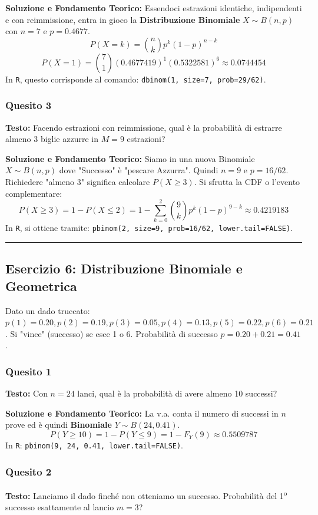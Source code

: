 \documentclass[12pt, a4paper]{article}
\begin{document}
\textbf{Soluzione e Fondamento Teorico:} 
Essendoci estrazioni identiche, indipendenti e con reimmissione, entra in gioco la \textbf{Distribuzione Binomiale} $X \sim B(n,p)$ con $n=7$ e $p=0.4677$.
$$ P(X=k) = \binom{n}{k} p^k (1-p)^{n-k} $$
$$ P(X=1) = \binom{7}{1} (0.4677419)^1 (0.5322581)^6 \approx 0.0744454 $$
In \texttt{R}, questo corrisponde al comando: \texttt{dbinom(1, size=7, prob=29/62)}.

\subsubsection*{Quesito 3}
\textbf{Testo:} Facendo estrazioni con reimmissione, qual è la probabilità di estrarre almeno 3 biglie azzurre in $M=9$ estrazioni?

\textbf{Soluzione e Fondamento Teorico:} 
Siamo in una nuova Binomiale $X \sim B(n,p)$ dove "Successo" è "pescare Azzurra". Quindi $n=9$ e $p=16/62$.
Richiedere "almeno 3" significa calcolare $P(X \ge 3)$. Si sfrutta la CDF o l'evento complementare:
$$ P(X \ge 3) = 1 - P(X \le 2) = 1 - \sum_{k=0}^{2} \binom{9}{k} p^k (1-p)^{9-k} \approx 0.4219183 $$
In \texttt{R}, si ottiene tramite: \texttt{pbinom(2, size=9, prob=16/62, lower.tail=FALSE)}.

\vspace{0.5cm}\hrule\vspace{0.5cm}

\subsection*{Esercizio 6: Distribuzione Binomiale e Geometrica}
Dato un dado truccato: $p(1)=0.20, p(2)=0.19, p(3)=0.05, p(4)=0.13, p(5)=0.22, p(6)=0.21$. 
Si "vince" (successo) se esce 1 o 6. Probabilità di successo $p = 0.20 + 0.21 = 0.41$.

\subsubsection*{Quesito 1}
\textbf{Testo:} Con $n=24$ lanci, qual è la probabilità di avere almeno 10 successi?

\textbf{Soluzione e Fondamento Teorico:} 
La v.a. conta il numero di successi in $n$ prove ed è quindi \textbf{Binomiale} $Y \sim B(24, 0.41)$.
$$ P(Y \ge 10) = 1 - P(Y \le 9) = 1 - F_Y(9) \approx 0.5509787 $$
In \texttt{R}: \texttt{pbinom(9, 24, 0.41, lower.tail=FALSE)}.

\subsubsection*{Quesito 2}
\textbf{Testo:} Lanciamo il dado finché non otteniamo un successo. Probabilità del 1\textsuperscript{o} successo esattamente al lancio $m=3$?
\end{document}
